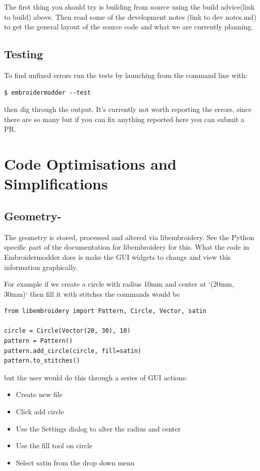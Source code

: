 \documentclass[11pt]{report}
\begin{document}
The first thing you should try is building from source using the build advice(link to build)
above. Then read some of the development notes (link to dev notes.md) to get the general
layout of the source code and what we are currently planning.

\subsection{Testing}

To find unfixed errors run the tests by launching from the command line with:

\begin{lstlisting}
$ embroidermodder --test
\end{lstlisting}

then dig through the output. It's currently not worth reporting the errors, since
there are so many but if you can fix anything reported here you can submit a PR.

\section{Code Optimisations and Simplifications}

\subsection{Geometry-}

The geometry is stored, processed and altered via libembroidery. See the Python specific part
of the documentation for libembroidery for this. What the code in Embroidermodder does is make
the GUI widgets to change and view this information graphically.

For example if we create a circle with radius 10mm and center at `(20mm, 30mm)` then fill it
with stitches the commands would be

\begin{lstlisting}
from libembroidery import Pattern, Circle, Vector, satin

circle = Circle(Vector(20, 30), 10)
pattern = Pattern()
pattern.add_circle(circle, fill=satin)
pattern.to_stitches()
\end{lstlisting}

but the user would do this through a series of GUI actions:

\begin{itemize}
\item Create new file
\item Click add circle
\item Use the Settings dialog to alter the radius and center
\item Use the fill tool on circle
\item Select satin from the drop down menu
\end{itemize}
\end{document}
